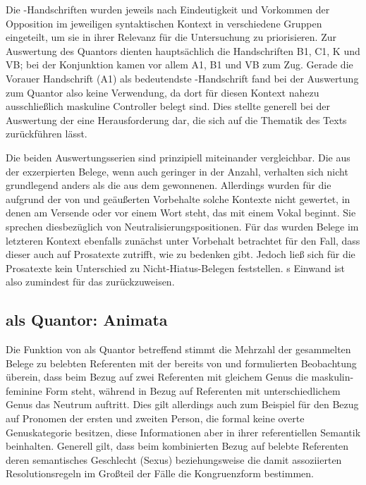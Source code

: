 Die \KC{}-Handschriften wurden jeweils nach Eindeutigkeit und Vorkommen der
Opposition im jeweiligen syntaktischen Kontext in verschiedene Gruppen
eingeteilt, um sie in ihrer Relevanz für die Untersuchung zu priorisieren. Zur
Auswertung des Quantors  dienten hauptsächlich die Handschriften
B1, C1, K und VB; bei der Konjunktion  kamen vor allem A1, B1 und
VB zum Zug. Gerade die Vorauer Handschrift (A1) als bedeutendste
\KC{}-Handschrift fand bei der Auswertung zum Quantor  also keine
Verwendung, da dort für diesen Kontext nahezu ausschließlich maskuline
Controller belegt sind. Dies stellte generell bei der Auswertung der \KC{} eine
Herausforderung dar, die sich auf die Thematik des Texts zurückführen lässt.

Die beiden Auswertungsserien sind prinzipiell miteinander vergleichbar. Die aus
der \KC{} exzerpierten Belege, wenn auch geringer in der Anzahl, verhalten sich
nicht grundlegend anders als die aus dem \CAO{} gewonnenen. Allerdings wurden
für die \KC{} aufgrund der von \citet[89--90]{askedal1973} und
\citet[191]{gjelsten1980} geäußerten Vorbehalte solche Kontexte nicht gewertet,
in denen  am Versende oder vor einem Wort steht, das mit einem
Vokal beginnt. Sie sprechen diesbezüglich von Neutralisierungs\-positionen. Für
das \CAO{} wurden Belege im letzteren Kontext ebenfalls zunächst unter
Vorbehalt betrachtet für den Fall, dass dieser auch auf Prosatexte zutrifft,
wie \citet[92]{askedal1973} zu bedenken gibt. Jedoch ließ sich für die
Prosatexte kein Unterschied zu Nicht-\allowbreak{}Hiatus-\allowbreak{}Belegen
feststellen. \citeauthor{askedal1973}s Einwand ist also zumindest für das
\CAO{} zurückzuweisen.

\subsection{ als Quantor: Animata}

Die Funktion von  als Quantor betreffend stimmt die Mehrzahl der
gesammelten Belege zu belebten Referenten mit der bereits von
\citet[312]{grimm1890} und \citet[39--41]{behaghel1928} formulierten
Beobachtung überein, dass beim Bezug auf zwei Referenten mit gleichem Genus die
maskulin-feminine Form steht, während in Bezug auf Referenten mit
unterschiedlichem Genus das Neutrum auftritt. Dies gilt allerdings auch zum
Beispiel für den Bezug auf Pronomen der ersten und zweiten Person, die formal
keine overte Genuskategorie besitzen, diese Informationen aber in ihrer
referentiellen Semantik beinhalten. Generell gilt, dass beim kombinierten Bezug
auf belebte Referenten deren semantisches Geschlecht (Sexus) beziehungsweise
die damit assoziierten Resolutionsregeln im Großteil der Fälle die
Kongruenzform bestimmen.

